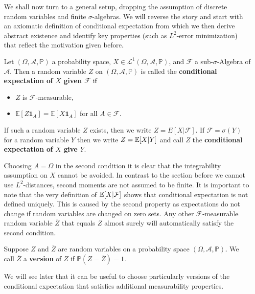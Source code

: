 We shall now turn to a general setup, dropping the assumption of discrete random variables and finite $\sigma$-algebras. We will reverse the story and start with an axiomatic definition of conditional expectation from which we then derive abstract existence and identify key properties (such as $L^2$-error minimization) that reflect the motivation given before. 

\begin{lDef}
\begin{deff}\label{deff_condexp}
	Let $(\Omega, \mathcal A, \mathbb P)$ a probability space, $X\in \mathcal L^1(\Omega, \mathcal A, \mathbb P)$, and $\mathcal F$ a sub-$\sigma$-Algebra of $\mathcal A$. Then a random variable $Z$  on $(\Omega, \mathcal A, \mathbb P)$ is called the \textbf{conditional expectation of $X$ given $\mathcal F$} if
	\begin{itemize}
		\item $Z$ is $\mathcal F$-measurable,
		\item $\mathbb E[Z \mathbf 1_A]=\mathbb E[X \mathbf 1_A]$ for all $A\in \mathcal F$.
	\end{itemize}
	If such a random variable $Z$ exists, then we write $Z=E[X|\mathcal F]$. If $\mathcal F=\sigma(Y)$ for a  random variable $Y$ then we write $Z=\mathbb{E}[X|Y]$ and call $Z$ the \textbf{conditional expectation of $X$ give $Y$}.
\end{deff}
\end{lDef}
Choosing $A=\Omega$ in the second condition it is clear that the integrability assumption on $X$ cannot be avoided. In contrast to the section before we cannot use $L^2$-distances, second moments are not assumed to be finite. It is important to note that the very definition of $\mathbb{E}[X|\mathcal F]$ shows that conditional expectation is not defined uniquely. This is caused by the second property as expectations do not change if random variables are changed on zero sets. Any other $\mathcal F$-measurable random variable $\bar Z$ that equals $Z$ almost surely will automatically satisfy the second condition.
\begin{ldef}
\begin{deff}
	Suppose $Z$ and $\bar Z$ are random variables on a probability space $(\Omega, \mathcal A, \mathbb P)$. We call $\bar Z$ a \textbf{version} of $Z$ if $\mathbb P(Z=\bar Z)=1$.
\end{deff}
\end{ldef}
We will see later that it can be useful to choose particularly versions of the conditional expectation that satisfies additional measurability properties.

